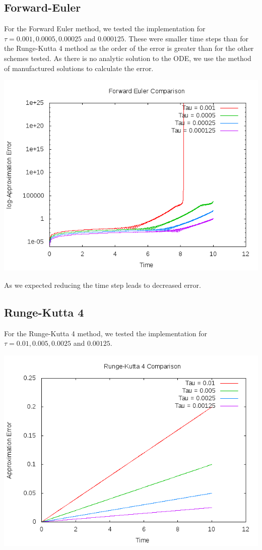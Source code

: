 \documentclass[letterpaper,12pt]{article}
\begin{document}
\subsection{Forward-Euler} 

For the Forward Euler method, we tested the implementation for $\tau = 0.001, 0.0005, 0.00025$ and $0.000125$. These were smaller time steps than for the Runge-Kutta 4 method as the order of the error is greater than for the other schemes tested. As there is no analytic solution to the ODE, we use the method of manufactured solutions to calculate the error.

\centerline{\includegraphics[scale = 0.75]{FE.png}}

As we expected reducing the time step leads to decreased error.


\subsection{Runge-Kutta 4}

For the Runge-Kutta 4 method, we tested the implementation for $\tau = 0.01, 0.005, 0.0025$ and $0.00125$.

\centerline{\includegraphics[scale = 0.75]{RK4.png}}
\end{document}
